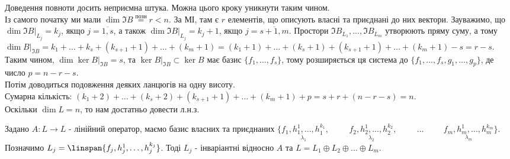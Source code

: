\begin{remark}
Доведення повноти досить неприємна штука. Можна цього кроку уникнути таким чином.\\
Із самого початку ми мали $\dim \Im B \overset{\text{позн}}{=} r < n$. За МІ, там є $r$ елементів, що описують власні та приєднані до них вектори. Зауважимо, що $\dim \Im B|_{L_j} = k_j$, якщо $j = \overline{1,s}$, а також $\dim \Im B|_{L_j} = k_j + 1$, якщо $j = \overline{s+1,m}$. Простори $\Im B_{L_1},\dots, \Im B_{L_m}$ утворюють пряму суму, а тому $\dim B|_{\Im B} = k_1 + \dots + k_s + (k_{s+1}+1) + \dots + (k_m+1) = (k_1 + 1) + \dots + (k_s + 1) + (k_{s+1}+1) + \dots + (k_m+1) - s = r - s$. Таким чином, $\dim \ker B|_{\Im B} = s$, та $\ker B|_{\Im B} \subset \ker B$ має базис $\{f_1,\dots,f_s\}$, тому розширяється ця система до $\{f_1,\dots,f_s, g_1,\dots,g_p\}$, де число $p = n-r-s$.\\
Потім доводиться подовження деяких ланцюгів на одну висоту.\\
Сумарна кількість: $(k_1+2)+ \dots + (k_s+2) + (k_{s+1}+1) + \dots + (k_m+1) + p = s+r + (n-r-s) = n$.\\
Оскільки $\dim L = n$, то нам достатньо довести л.н.з.
\end{remark}

\begin{theorem}
Задано $A: L \to L$ - лінійний оператор, маємо базис власних та приєднаних $\{\underset{\lambda_1}{f_1, h_1^1, \dots ,h_1^{k_1}}, \hspace{1cm} \underset{\lambda_2}{f_2, h_2^1, \dots, h_2^{k_2}}, \hspace{1cm} \dots \hspace{1cm} \underset{\lambda_m}{f_m, h_m^{1}, \dots, h_m^{k_m}}\}$.\\
Позначимо $L_j = \linspan\{f_j, h_j^1,\dots, h_j^{k_j}\}$. Тоді $L_j$ - інваріантні відносно $A$ та $L = L_1  \oplus  L_2  \oplus  \dots  \oplus  L_m$.
\end{theorem}

